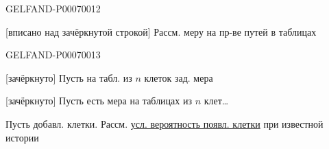 \begin{GelfandAdjacentEvidence}{GELFAND-P000700}{12}


[вписано над зачёркнутой строкой] Рассм. меру на пр-ве путей в таблицах
\end{GelfandAdjacentEvidence}
\begin{GelfandAdjacentEvidence}{GELFAND-P000700}{13}


[зачёркнуто] Пусть на табл. из \(n\) клеток зад. мера

[зачёркнуто] Пусть есть мера на таблицах из \(n\) клет…
\end{GelfandAdjacentEvidence}


Пусть добавл. клетки. Рассм. \underline{усл. вероятность появл. клетки} при известной истории


